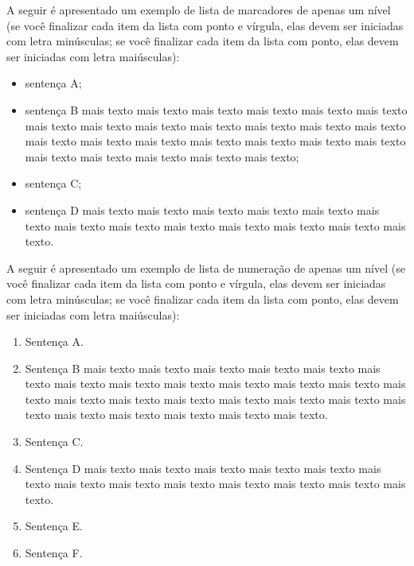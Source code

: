 \documentclass[
	12pt,				%
	oneside,			%
	a4paper,			%
	english,			%
	brazil				%
	]{abntex2ppgsi}
\begin{document}
A seguir é apresentado um exemplo de lista de marcadores de apenas um nível (se você finalizar cada item da lista com ponto e vírgula, elas devem ser iniciadas com letra minúsculas; se você finalizar cada item da lista com ponto, elas devem ser iniciadas com letra maiúsculas):
\begin{itemize}
	\item sentença A;
	\item sentença B mais texto mais texto mais texto mais texto mais texto mais texto mais texto mais texto mais texto mais texto mais texto mais texto mais texto mais texto mais texto mais texto mais texto mais texto mais texto mais texto mais texto mais texto mais texto mais texto mais texto;
	\item sentença C;
	\item sentença D mais texto mais texto mais texto mais texto mais texto mais texto mais texto mais texto mais texto mais texto mais texto mais texto mais texto.
\end{itemize}

A seguir é apresentado um exemplo de lista de numeração de apenas um nível (se você finalizar cada item da lista com ponto e vírgula, elas devem ser iniciadas com letra minúsculas; se você finalizar cada item da lista com ponto, elas devem ser iniciadas com letra maiúsculas):
\begin{enumerate}
	\item Sentença A.
	\item Sentença B mais texto mais texto mais texto mais texto mais texto mais texto mais texto mais texto mais texto mais texto mais texto mais texto mais texto mais texto mais texto mais texto mais texto mais texto mais texto mais texto mais texto mais texto mais texto mais texto mais texto.
	\item Sentença C.
	\item Sentença D mais texto mais texto mais texto mais texto mais texto mais texto mais texto mais texto mais texto mais texto mais texto mais texto mais texto.
	\item Sentença E.
	\item Sentença F.
\end{enumerate}
\end{document}
